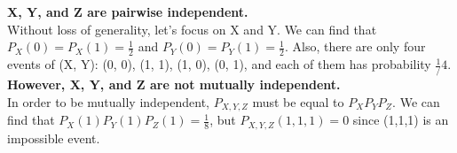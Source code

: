 \documentclass[11pt]{article}
\theoremstyle{quest}
\begin{document}
\begin{itemize}
\textbf{X, Y, and Z are pairwise independent.}\\
Without loss of generality, let's focus on X and Y. We can find that $P_{X}(0) = P_{X}(1) = \frac{1}{2}$ and $P_{Y}(0) = P_{Y}(1) = \frac{1}{2}$.
Also, there are only four events of (X, Y): (0, 0), (1, 1), (1, 0), (0, 1), and each of them has probability $\frac{1}/{4}$.\\
\textbf{However, X, Y, and Z are not mutually independent.}\\
In order to be mutually independent, $P_{X,Y,Z}$ must be equal to $P_{X}P_{Y}P_{Z}$. We can find that $P_{X}(1)P_{Y}(1)P_{Z}(1) = \frac{1}{8}$, but $P_{X,Y,Z}(1,1,1) = 0$ since (1,1,1) is an impossible event.
\end{itemize}
\end{document}
